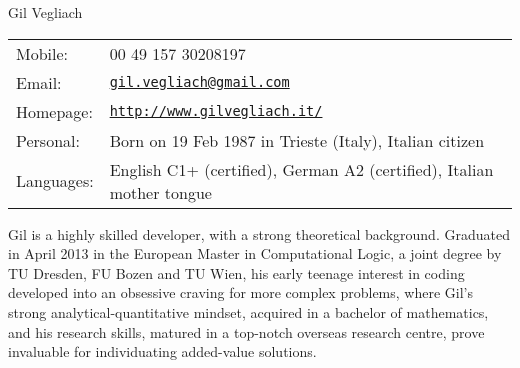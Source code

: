 \documentclass[letterpaper]{article}
\def\name{Gil Vegliach}
\begin{document}
{\huge \name}


\vspace{0.25in}

\begin{minipage}{0.45\linewidth}
  \begin{tabular}{ll}
    Mobile: & 00 49 157 30208197 \\
    Email: & \href{mailto:gil.vegliach@gmail.com}{\tt gil.vegliach@gmail.com} \\
    Homepage: & \href{http://www.gilvegliach.it/}{\tt http://www.gilvegliach.it/} \\
    Personal: & Born on 19 Feb 1987 in Trieste (Italy), Italian citizen\\
    Languages: & English C1+ (certified), German A2 (certified), Italian mother tongue
  \end{tabular}
\end{minipage}

\bigskip
Gil is a highly skilled developer, with a strong theoretical background. Graduated in April 2013 in the European Master in Computational Logic, a joint degree by TU Dresden, FU Bozen and TU Wien, his early teenage interest in coding developed into an obsessive craving for more complex problems, where 
Gil's strong analytical-quantitative mindset, acquired in a bachelor of mathematics, and his research skills, matured in a top-notch overseas research centre, prove invaluable for individuating added-value solutions. 


\end{document}
